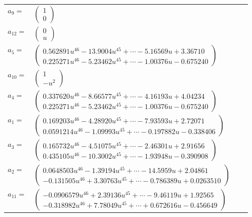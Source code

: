 \documentclass[1p]{elsarticle_modified}
\theoremstyle{definition}
\begin{document}
\begin{tabular}{m{7pt} m{180pt} m{7pt} m{180pt} }
\flushright $a_{9}=$&$\begin{pmatrix}1\\0\end{pmatrix}$ \\
\flushright $a_{12}=$&$\begin{pmatrix}0\\u\end{pmatrix}$ \\
\flushright $a_{5}=$&$\begin{pmatrix}0.562891 u^{46}-13.9004 u^{45}+\cdots-5.16569 u+3.36710\\0.225271 u^{46}-5.23462 u^{45}+\cdots-1.00376 u-0.675240\end{pmatrix}$ \\
\flushright $a_{10}=$&$\begin{pmatrix}1\\- u^2\end{pmatrix}$ \\
\flushright $a_{4}=$&$\begin{pmatrix}0.337620 u^{46}-8.66577 u^{45}+\cdots-4.16193 u+4.04234\\0.225271 u^{46}-5.23462 u^{45}+\cdots-1.00376 u-0.675240\end{pmatrix}$ \\
\flushright $a_{1}=$&$\begin{pmatrix}0.169203 u^{46}-4.28920 u^{45}+\cdots-7.93593 u+2.72071\\0.0591214 u^{46}-1.09993 u^{45}+\cdots-0.197882 u-0.338406\end{pmatrix}$ \\
\flushright $a_{3}=$&$\begin{pmatrix}0.165732 u^{46}-4.51075 u^{45}+\cdots-2.46301 u+2.91656\\0.435105 u^{46}-10.3002 u^{45}+\cdots-1.93948 u-0.390908\end{pmatrix}$ \\
\flushright $a_{2}=$&$\begin{pmatrix}0.0648503 u^{46}-1.39194 u^{45}+\cdots-14.5959 u+2.04861\\-0.131505 u^{46}+3.30763 u^{45}+\cdots-0.786389 u+0.0263510\end{pmatrix}$ \\
\flushright $a_{11}=$&$\begin{pmatrix}-0.0906579 u^{46}+2.39136 u^{45}+\cdots-9.46119 u+1.92565\\-0.318982 u^{46}+7.78049 u^{45}+\cdots+0.672616 u-0.456649\end{pmatrix}$ \\

\end{tabular}
\end{document}
